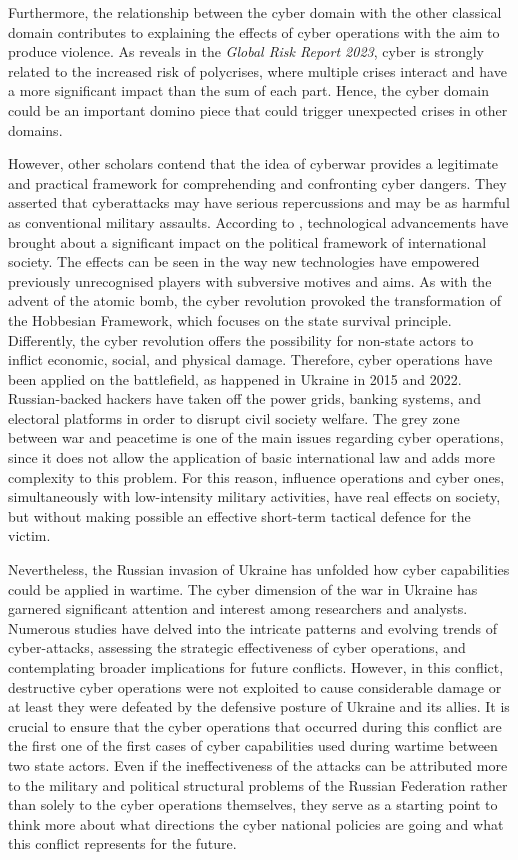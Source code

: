 Furthermore, the relationship between the cyber domain with the other classical domain contributes to explaining the effects of cyber operations with the aim to produce violence. As \textcite{worldeconomicforum_2023_the} reveals in the\textit{ Global Risk Report 2023}, cyber is strongly related to the increased risk of polycrises, where multiple crises interact and have a more significant impact than the sum of each part. Hence, the cyber domain could be an important domino piece that could trigger unexpected crises in other domains. 

However, other scholars contend that the idea of cyberwar provides a legitimate and practical framework for comprehending and confronting cyber dangers. They asserted that cyberattacks may have serious repercussions and may be as harmful as conventional military assaults. According to \textcite{kello_2013_the}, technological advancements have brought about a significant impact on the political framework of international society. The effects can be seen in the way new technologies have empowered previously unrecognised players with subversive motives and aims. As with the advent of the atomic bomb, the cyber revolution provoked the transformation of the Hobbesian Framework, which focuses on the state survival principle. Differently, the cyber revolution offers the possibility for non-state actors to inflict economic, social, and physical damage. Therefore, cyber operations have been applied on the battlefield, as happened in Ukraine in 2015 and 2022. Russian-backed hackers have taken off the power grids, banking systems, and electoral platforms in order to disrupt civil society welfare. The grey zone between war and peacetime is one of the main issues regarding cyber operations, since it does not allow the application of basic international law and adds more complexity to this problem. For this reason, influence operations and cyber ones, simultaneously with low-intensity military activities, have real effects on society, but without making possible an effective short-term tactical defence for the victim. 

Nevertheless, the Russian invasion of Ukraine has unfolded how cyber capabilities could be applied in wartime. The cyber dimension of the war in Ukraine has garnered significant attention and interest among researchers and analysts. Numerous studies have delved into the intricate patterns and evolving trends of cyber-attacks, assessing the strategic effectiveness of cyber operations, and contemplating broader implications for future conflicts. However, in this conflict, destructive cyber operations were not exploited to cause considerable damage or at least they were defeated by the defensive posture of Ukraine and its allies. It is crucial to ensure that the cyber operations that occurred during this conflict are the first one of the first cases of cyber capabilities used during wartime between two state actors. Even if the ineffectiveness of the attacks can be attributed more to the military and political structural problems of the Russian Federation rather than solely to the cyber operations themselves, they serve as a starting point to think more about what directions the cyber national policies are going and what this conflict represents for the future.

